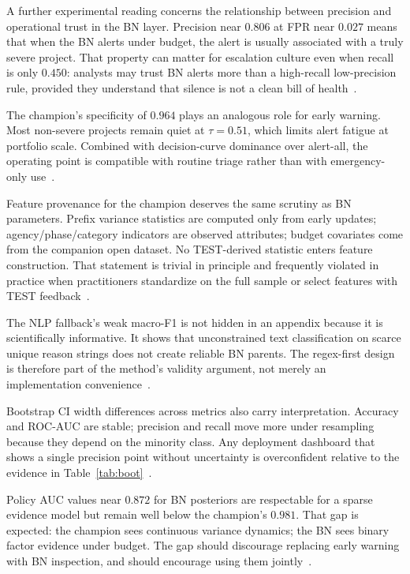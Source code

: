 A further experimental reading concerns the relationship between precision and operational trust in the BN layer. Precision near $0.806$ at FPR near $0.027$ means that when the BN alerts under budget, the alert is usually associated with a truly severe project. That property can matter for escalation culture even when recall is only $0.450$: analysts may trust BN alerts more than a high-recall low-precision rule, provided they understand that silence is not a clean bill of health~\cite{Vickers2006,Saito2015}.

The champion's specificity of $0.964$ plays an analogous role for early warning. Most non-severe projects remain quiet at $\tau{=}0.51$, which limits alert fatigue at portfolio scale. Combined with decision-curve dominance over alert-all, the operating point is compatible with routine triage rather than with emergency-only use~\cite{Vickers2006,Gneiting2007}.

Feature provenance for the champion deserves the same scrutiny as BN parameters. Prefix variance statistics are computed only from early updates; agency/phase/category indicators are observed attributes; budget covariates come from the companion open dataset. No TEST-derived statistic enters feature construction. That statement is trivial in principle and frequently violated in practice when practitioners standardize on the full sample or select features with TEST feedback~\cite{Egwim2021,Tagharobi2025}.

The NLP fallback's weak macro-F1 is not hidden in an appendix because it is scientifically informative. It shows that unconstrained text classification on scarce unique reason strings does not create reliable BN parents. The regex-first design is therefore part of the method's validity argument, not merely an implementation convenience~\cite{Onisko2001,Woldesenbet2016}.

Bootstrap CI width differences across metrics also carry interpretation. Accuracy and ROC-AUC are stable; precision and recall move more under resampling because they depend on the minority class. Any deployment dashboard that shows a single precision point without uncertainty is overconfident relative to the evidence in Table~\ref{tab:boot}~\cite{Hand2009,GneitingRaftery2007}.

Policy AUC values near $0.872$ for BN posteriors are respectable for a sparse evidence model but remain well below the champion's $0.981$. That gap is expected: the champion sees continuous variance dynamics; the BN sees binary factor evidence under budget. The gap should discourage replacing early warning with BN inspection, and should encourage using them jointly~\cite{Luu2009,Egwim2021}.

